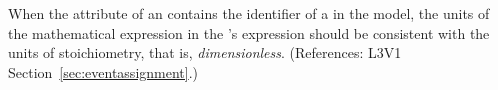 When the  attribute of an \EventAssignment
contains the identifier of a \SpeciesReference in the model, the
units of the mathematical expression in the
\EventAssignment's  expression should be
consistent with the units of stoichiometry,
that is, \emph{dimensionless}.
(References: L3V1 Section~\ref{sec:eventassignment}.)
